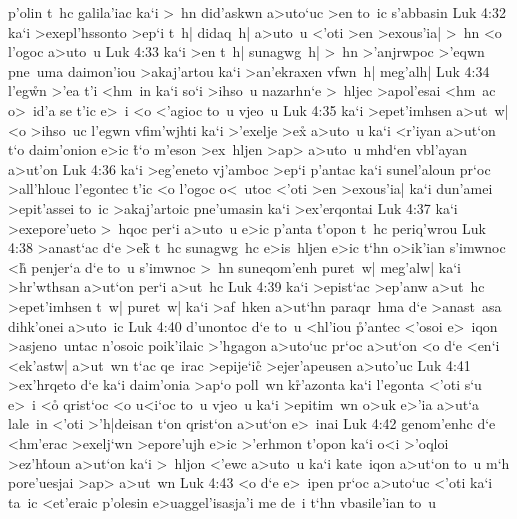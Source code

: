 p'olin
t~hc
galila'iac
ka`i
>~hn
did'askwn
a>uto`uc
>en
to~ic
s'abbasin\bibvsend
\vs Luk 4:32
ka`i
>exepl'hssonto
>ep`i
t~h|
didaq~h|
a>uto~u
<'oti
>en
>exous'ia|
>~hn
<o
l'ogoc
a>uto~u\bibvsend
\vs Luk 4:33
ka`i
>en
t~h|
sunagwg~h|
>~hn
>'anjrwpoc
>'eqwn
pne~uma
daimon'iou
>akaj'artou
ka`i
>an'ekraxen
vfwn~h|
meg'alh|\bibvsend
\vs Luk 4:34
l'eg\r{w}n
>'ea
t'i
<hm~in
ka`i
so`i
>ihso~u
nazarhn`e
>~hljec
>apol'esai
<hm~ac
o>~id'a
se
t'ic
e>~i
<o
<'agioc
to~u
vjeo~u\bibvsend
\vs Luk 4:35
ka`i
>epet'imhsen
a>ut~w|
<o
>ihso~uc
l'egwn
vfim'wjhti
ka`i
>'exelje
>ex\r{}
a>uto~u
ka`i
<r'iyan
a>ut`on
t`o
daim'onion
e>ic
\r{t}`o
m'eson
>ex~hljen
>ap>
a>uto~u
mhd`en
vbl'ayan
a>ut'on\bibvsend
\vs Luk 4:36
ka`i
>eg'eneto
vj'amboc
>ep`i
p'antac
ka`i
sunel'aloun
pr`oc
>all'hlouc
l'egontec
t'ic
<o
l'ogoc
o<~utoc
<'oti
>en
>exous'ia|
ka`i
dun'amei
>epit'assei
to~ic
>akaj'artoic
pne'umasin
ka`i
>ex'erqontai\bibvsend
\vs Luk 4:37
ka`i
>exepore'ueto
>~hqoc
per`i
a>uto~u
e>ic
p'anta
t'opon
t~hc
periq'wrou\bibvsend
\vs Luk 4:38
>anast`ac
d`e
>e\r{k}
t~hc
sunagwg~hc
e>is~hljen
e>ic
t`hn
o>ik'ian
s'imwnoc
<h\r{}
penjer`a
d`e
to~u
s'imwnoc
>~hn
suneqom'enh
puret~w|
meg'alw|
ka`i
>hr'wthsan
a>ut`on
per`i
a>ut~hc\bibvsend
\vs Luk 4:39
ka`i
>epist`ac
>ep'anw
a>ut~hc
>epet'imhsen
t~w|
puret~w|
ka`i
>af~hken
a>ut`hn
paraqr~hma
d`e
>anast~asa
dihk'onei
a>uto~ic\bibvsend
\vs Luk 4:40
d'unontoc
d`e
to~u
<hl'iou
\r{p}'antec
<'osoi
e>~iqon
>asjeno~untac
n'osoic
poik'ilaic
>'hgagon
a>uto`uc
pr`oc
a>ut`on
<o
d`e
<en`i
<ek'astw|
a>ut~wn
t`ac
qe~irac
>epije`ic\r{}
>ejer'apeusen
a>uto'uc\bibvsend
\vs Luk 4:41
>ex'hrqeto
d`e
ka`i
daim'onia
>ap`o
poll~wn
k\r{r}'azonta
ka`i
l'egonta
<'oti
s`u
e>~i
<o\r{}
qrist`oc
<o
u<i`oc
to~u
vjeo~u
ka`i
>epitim~wn
o>uk
e>'ia
a>ut`a
lale~in
<'oti
>'h|deisan
t`on
qrist`on
a>ut`on
e>~inai\bibvsend
\vs Luk 4:42
genom'enhc
d`e
<hm'erac
>exelj`wn
>epore'ujh
e>ic
>'erhmon
t'opon
ka`i
o<i
>'oqloi
>ez'h\r{t}oun
a>ut`on
ka`i
>~hljon
<'ewc
a>uto~u
ka`i
kate~iqon
a>ut`on
to~u
m`h
pore'uesjai
>ap>
a>ut~wn\bibvsend
\vs Luk 4:43
<o
d`e
e>~ipen
pr`oc
a>uto`uc
<'oti
ka`i
ta~ic
<et'eraic
p'olesin
e>uaggel'isasja'i
me
de~i
t`hn
vbasile'ian
to~u
